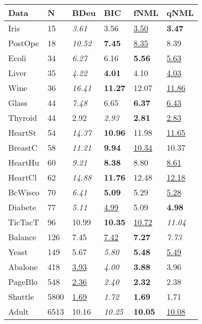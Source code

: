 \begin{tabular}{llllll}
\toprule
    Data &     N &              BDeu &               BIC &               fNML &               qNML \\
\midrule
    Iris &    15 &     \textit{3.61} &              3.56 &   \underline{3.50} &      \textbf{3.47} \\
 PostOpe &    18 &    \textit{10.52} &     \textbf{7.45} &   \underline{8.35} &               8.39 \\
   Ecoli &    34 &     \textit{6.27} &              6.16 &      \textbf{5.56} &   \underline{5.63} \\
   Liver &    35 &     \textit{4.22} &     \textbf{4.01} &               4.10 &   \underline{4.03} \\
    Wine &    36 &    \textit{16.41} &    \textbf{11.27} &              12.07 &  \underline{11.86} \\
   Glass &    44 &     \textit{7.48} &              6.65 &      \textbf{6.37} &   \underline{6.43} \\
 Thyroid &    44 &              2.92 &     \textit{2.93} &      \textbf{2.81} &   \underline{2.83} \\
 HeartSt &    54 &    \textit{14.37} &    \textbf{10.96} &              11.98 &  \underline{11.65} \\
 BreastC &    58 &    \textit{11.21} &     \textbf{9.94} &  \underline{10.34} &              10.37 \\
 HeartHu &    60 &     \textit{9.21} &     \textbf{8.38} &               8.80 &   \underline{8.61} \\
 HeartCl &    62 &    \textit{14.88} &    \textbf{11.76} &              12.48 &  \underline{12.18} \\
 BcWisco &    70 &     \textit{6.41} &     \textbf{5.09} &               5.29 &   \underline{5.28} \\
 Diabete &    77 &     \textit{5.11} &  \underline{4.99} &               5.09 &      \textbf{4.98} \\
 TicTacT &    96 &             10.99 &    \textbf{10.35} &  \underline{10.72} &     \textit{11.04} \\
 Balance &   126 &              7.45 &  \underline{7.42} &      \textbf{7.27} &      \textit{7.73} \\
   Yeast &   149 &              5.67 &     \textit{5.80} &      \textbf{5.48} &   \underline{5.49} \\
 Abalone &   418 &  \underline{3.93} &     \textit{4.00} &      \textbf{3.88} &               3.96 \\
 PageBlo &   548 &  \underline{2.36} &     \textit{2.40} &      \textbf{2.32} &               2.38 \\
 Shuttle &  5800 &  \underline{1.69} &     \textit{1.72} &      \textbf{1.69} &               1.71 \\
   Adult &  6513 &             10.16 &    \textit{10.25} &     \textbf{10.05} &  \underline{10.08} \\
\bottomrule
\end{tabular}
